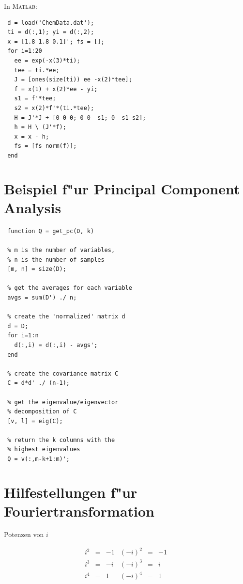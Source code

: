 \documentclass[german, 10pt, a4paper, twocolumn]{scrartcl}
\begin{document}
In \textsc{Matlab}:

\begin{verbatim}
 d = load('ChemData.dat');
 ti = d(:,1); yi = d(:,2);
 x = [1.8 1.8 0.1]'; fs = [];
 for i=1:20
   ee = exp(-x(3)*ti);
   tee = ti.*ee;
   J = [ones(size(ti)) ee -x(2)*tee];
   f = x(1) + x(2)*ee - yi;
   s1 = f'*tee;
   s2 = x(2)*f'*(ti.*tee);
   H = J'*J + [0 0 0; 0 0 -s1; 0 -s1 s2];
   h = H \ (J'*f);
   x = x - h;
   fs = [fs norm(f)];
 end
\end{verbatim}

\section{Beispiel f"ur Principal Component Analysis}

\begin{verbatim}
 function Q = get_pc(D, k)

 % m is the number of variables,
 % n is the number of samples
 [m, n] = size(D);

 % get the averages for each variable
 avgs = sum(D') ./ n;

 % create the 'normalized' matrix d
 d = D;
 for i=1:n
   d(:,i) = d(:,i) - avgs';
 end

 % create the covariance matrix C
 C = d*d' ./ (n-1);

 % get the eigenvalue/eigenvector
 % decomposition of C
 [v, l] = eig(C);

 % return the k columns with the
 % highest eigenvalues
 Q = v(:,m-k+1:m)';
\end{verbatim}

\section{Hilfestellungen f"ur Fouriertransformation}

Potenzen von $i$

\begin{displaymath}
	\begin{array}{lcrclcr}
		i^2 &	= &	-1 &	(-i)^2 &	= &	-1\\
		i^3 &	= &	-i &	(-i)^3 &	= &	i\\
		i^4 &	= &	1 &	(-i)^4 &	= &	1
	\end{array}
\end{displaymath}
\end{document}
